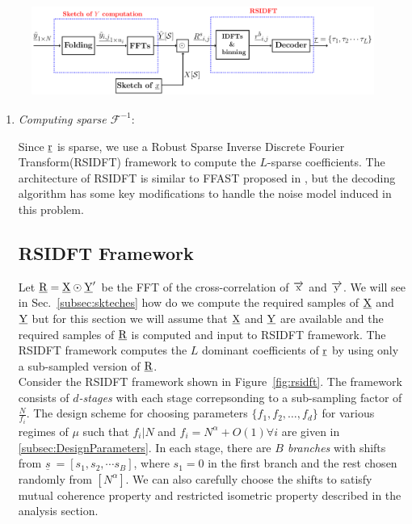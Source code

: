 \begin{figure}[h!]
	\begin{center}
		\includegraphics[height=3cm]{Figures/notional_diag} 
	\end{center}	   
	\caption{}\label{fig:notional}
	\vspace{5 pt}
\end{figure}

\begin{enumerate}
\item[\RNum{1}] \textit{Computing sparse $\mathcal{F}^{-1}$}:	

Since $\underline{\mathrm{r}}$ is sparse, we use a Robust Sparse Inverse  Discrete Fourier Transform(RSIDFT) framework to compute the $L$-sparse coefficients. The architecture of RSIDFT is similar to FFAST proposed in \cite{pawar2014robust}, but the decoding algorithm has some key modifications to handle the noise model induced in this problem.
 
\subsection{RSIDFT Framework} 	
\label{subsec:RSIDFT}	
	  Let $ \underline{\mathrm{R}}  =  \underline{\mathrm{X}} \odot \underline{\mathrm{Y}}'$ be the FFT of the cross-correlation of $\overrightarrow{\mathrm{x}}$ and $\overrightarrow{\mathrm{y}}$. We will see in Sec.~\ref{subsec:skteches} how do we compute the required samples of $\underline{\mathrm{X}}$ and $\underline{\mathrm{Y}}$ but for this section we will assume that $\underline{\mathrm{X}}$ and $\underline{\mathrm{Y}}$ are available and the required samples of $\underline{\mathrm{R}}$ is computed and input to RSIDFT framework. The RSIDFT framework computes the $L$ dominant coefficients of $\underline{\mathrm{r}}$ by using only a sub-sampled version of $\underline{\mathrm{R}}$.\\
	  	  
Consider the RSIDFT framework shown in Figure~\ref{fig:rsidft}. The framework consists of {\it $d$-stages} with each stage correpsonding to a sub-sampling factor of $\frac{N}{f_i}$. The design scheme for choosing parameters $\{f_1,f_2,\ldots,f_d\}$ for various regimes of $\mu$ such that $f_i | N$ and $f_i=N^{\alpha}+O(1) \forall i$ are given in \ref{subsec:DesignParameters}. In each stage, there are {\it $B$ branches} with shifts from $\underline{s}\ = [s_1, s_2, \cdots s_B] $, where $s_1 =0$ in the first branch and the rest chosen randomly from $[N^{\alpha}]$. We can also carefully choose the shifts to satisfy mutual coherence property and restricted isometric property described in the analysis section.\\
	   

\end{enumerate}
